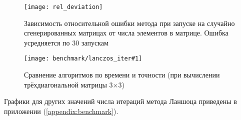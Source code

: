\begin{figure}[H]
    \texttt{[image: rel\_deviation]}
    \label{fig:rel_deviation}
    \caption{Зависимость относительной ошибки метода при запуске на случайно сгенерированных матрицах от числа элементов в матрице. Ошибка усредняется по 30 запускам}
\end{figure}

\newcommand{\lanczosBenchmarkFig}[1]{
    \begin{figure}[H]
        \texttt{[image: benchmark/lanczos\_iter\#1]}
        \label{fig:lanczos_benchmark#1}
        \caption{ Сравнение алгоритмов по времени и точности (при вычислении трёхдиагональной матрицы #1$\times$#1) }
    \end{figure}
}

\lanczosBenchmarkFig{3}

Графики для других значений числа итераций метода Ланшоца приведены в приложении (\ref{appendix:benchmark}).
